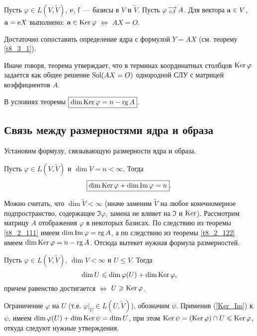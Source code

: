 \begin{theor}\label{t8_2_122}
Пусть $\varphi \in L(V, \widetilde{V})$,  $\mathrm{e}$, $\mathrm{f}$ --- базисы в $V$ и $\widetilde{V}$.
Пусть $\varphi \begin{smallmatrix} \longrightarrow \\ \mathrm{e}, \mathrm{f} \end{smallmatrix} A$.
Для вектора $\mathbf{a} \in V$, $\mathbf{a}=\mathrm{e}X$ выполнено:
$\mathbf{a} \in \mathop{\rm Ker}\nolimits \varphi$ $\Leftrightarrow$ $AX =O$. 
\end{theor}
\dok  Достаточно сопоставить определение ядра с  формулой $Y=AX$ (см. теорему \ref{t8_3_1}).
\edok

\otstup

Иначе говоря, теорема утверждает, что в терминах координатных столбцов $\mathop{\rm Ker}\nolimits \varphi$ задается как 
общее решение  $\mathop{\rm Sol}\nolimits (AX=O)$ однородной СЛУ с матрицей коэффициентов $A$.

\begin{sled}
В условиях теоремы $\boxed{\mathop{\rm dim}\nolimits \mathop{\rm Ker}\nolimits \varphi = n - \mathop{\rm rg}\nolimits A}$.
\end{sled}




\subsection{Связь между размерностями ядра и образа}

Установим формулу, связывающую размерности  ядра и образа.


\begin{theor}\label{t8_2_2}
Пусть $\varphi \in L(V, \widetilde{V})$ и $\dim V =n < \infty $.
Тогда 
\begin{equation}\label{Ker_Im}
\boxed{\mathop{\rm dim}\nolimits \mathop{\rm Ker}\nolimits \varphi + \mathop{\rm dim}\nolimits \mathop{\rm Im}\nolimits \varphi = n}.
\end{equation}
\end{theor}
\dok Можно считать, что $\dim \widetilde{V}<\infty $ (иначе заменим $\widetilde{V}$ на любое конечномерное подпространство, содержащее $\Im \varphi$, 
замена  не влияет на $\Im$ и $\mathop{\rm Ker}\nolimits $). 
Рассмотрим матрицу $A$ отображения $\varphi$ в некоторых базисах.
По следствию из теоремы \ref{t8_2_111} имеем $\mathop{\rm dim}\nolimits \mathop{\rm Im}\nolimits \varphi = \mathop{\rm rg}\nolimits A$,
а по следствию из теоремы \ref{t8_2_122} имеем $\mathop{\rm dim}\nolimits \mathop{\rm Ker}\nolimits \varphi = n - \mathop{\rm rg}\nolimits A$.
Отсюда вытекет нужная формула размерностей.
\edok

\begin{sled}\label{sootv_mezhdu_podpr}
Пусть $\varphi \in L(V, \widetilde{V})$, $\dim V<\infty $ и  $U\leq V$. Тогда
\begin{equation}\label{dimUphiU}
\mathop{\rm dim}\nolimits U \leqslant \mathop{\rm dim}\nolimits \varphi (U) +  \mathop{\rm dim}\nolimits \mathop{\rm Ker}\nolimits \varphi,
\end{equation}
причем равенство  достигается $\Leftrightarrow$
$U\geqslant \mathop{\rm Ker}\nolimits \varphi$.
\end{sled}
\dok Ограничение $\varphi$ на $U$ (т.е. $\varphi  |_{U}  \in L(U, \widetilde{V})$),
обозначим $\psi$. Применив (\ref{Ker_Im}) к $\psi$,
имеем $ \mathop{\rm dim}\nolimits \varphi (U) +  \mathop{\rm dim}\nolimits \mathop{\rm Ker}\nolimits \psi = \mathop{\rm dim}\nolimits U $, при этом 
$\mathop{\rm Ker}\nolimits \psi = (\mathop{\rm Ker}\nolimits \varphi )\cap U \leqslant \mathop{\rm Ker}\nolimits \varphi$,
откуда следуют нужные утверждения.
\edok

